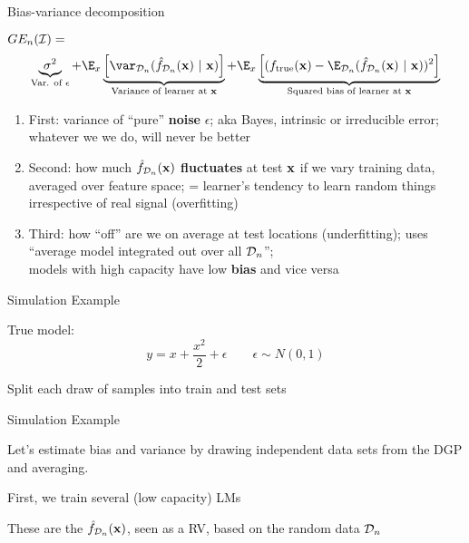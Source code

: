 \documentclass[11pt,compress,t,notes=noshow, xcolor=table]{beamer}
\begin{document}
\begin{frame}{Bias-variance decomposition}


$GE_n(\mathcal{I}) =$  
$$
\underbrace{\sigma^2}_{\text{Var. of $\epsilon$}} + \E_{x}\underbrace{\left[\var_{\D_n}(\fh_{\D_n}(\xv) ~|~\xv)\right]}_{\text{Variance of learner at } \xv} + \E_{x}\underbrace{\left[(\ftrue(\xv)-\E_{\D_n}(\fh_{\D_n}(\xv)~|~\xv))^2\right]}_{\text{Squared bias of learner at } \xv}  
$$

\begin{enumerate}
\item First: variance of ``pure''
\textbf{noise} $\epsilon$; aka Bayes, intrinsic or irreducible error; 
whatever we we do, will never be better
\item Second: how much \textbf{$\hat{f}_{\mathcal{D}_n}(\mathbf{x})$ fluctuates} at test $\mathbf{x}$ if we vary training data, averaged over feature space; = learner's tendency to learn random things irrespective of real signal (overfitting)

\item Third: how ``off'' are we on average at test locations (underfitting); uses ``average model integrated out over all $\mathcal{D}_n$''; \\
models with high capacity have low \textbf{bias} and vice versa
\end{enumerate}


\end{frame} 

\begin{framei}[sep=L]{Simulation Example}

\item True model:
$$y = x + \frac{x^2}{2} + \epsilon  \qquad \epsilon \sim 
N (0, 1)$$
\item Split each draw of samples into train and test sets 


\end{framei} 


\begin{framei}[sep=M]{Simulation Example}

\item Let's estimate bias and variance by drawing independent data sets from the DGP and averaging.


\item First, we train several (low capacity) LMs
\item These are the $\hat{f}_{\mathcal{D}_n}(\mathbf{x})$, seen as a RV, based on the random
data $\mathcal{D}_n$

\hfill

\splitVCC
{}
{}

\end{framei} 
\end{document}
